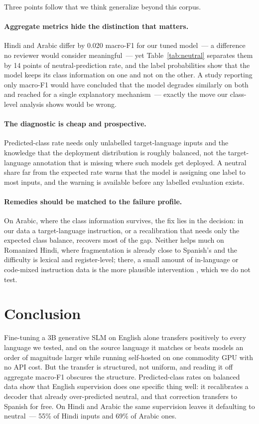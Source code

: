 \documentclass[11pt]{article}
\begin{document}
Three points follow that we think generalize beyond this corpus.

\paragraph{Aggregate metrics hide the distinction that matters.} Hindi and Arabic
differ by 0.020 macro-F1 for our tuned model~--- a difference no reviewer would
consider meaningful~--- yet Table~\ref{tab:neutral} separates them by 14 points of
neutral-prediction rate, and the label probabilities show that the model keeps its
class information on one and not on the other. A study reporting only macro-F1 would have concluded that the model
degrades similarly on both and reached for a single explanatory mechanism~---
exactly the move our class-level analysis shows would be wrong.

\paragraph{The diagnostic is cheap and prospective.} Predicted-class rate needs
only unlabelled target-language inputs and the knowledge that the deployment
distribution is roughly balanced, not the target-language annotation that is
missing where such models get deployed. A neutral share far from the expected rate warns that the model is
assigning one label to most inputs, and the warning is available before any
labelled evaluation exists.

\paragraph{Remedies should be matched to the failure profile.} On Arabic, where
the class information survives, the fix lies in the decision: in our data a
target-language instruction, or a recalibration that needs only the expected class
balance, recovers most of the gap. Neither helps much on Romanized Hindi, where
fragmentation is already close to Spanish's and the difficulty is lexical and
register-level; there, a small amount of in-language or code-mixed instruction data
is the more plausible intervention \citep{shaham2024pinch}, which we do not test.

\section{Conclusion}
\label{sec:conclusion}

Fine-tuning a 3B generative SLM on English alone transfers positively to every
language we tested, and on the source language it matches or beats models an order
of magnitude larger while running self-hosted on one commodity GPU with no API cost.
But the transfer is
structured, not uniform, and reading it off aggregate macro-F1 obscures the
structure. Predicted-class rates on balanced data show that English supervision
does one specific thing well: it recalibrates a decoder that already
over-predicted neutral, and that correction transfers to Spanish for free. On
Hindi and Arabic the same supervision leaves it defaulting to neutral~--- 55\% of
Hindi inputs and 69\% of Arabic ones.
\end{document}
